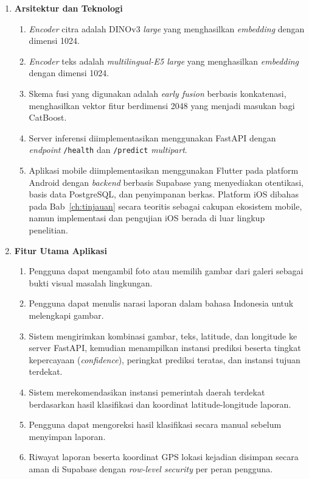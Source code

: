 \begin{enumerate}
    \item \textbf{Arsitektur dan Teknologi}
    \begin{enumerate}
        \item \textit{Encoder} citra adalah DINOv3 \textit{large} \citep{simeoniDINOv32025} yang menghasilkan \textit{embedding} dengan dimensi 1024.
        \item \textit{Encoder} teks adalah \textit{multilingual-E5 large} \citep{wangE5Multilingual2024} yang menghasilkan \textit{embedding} dengan dimensi 1024.
        \item Skema fusi yang digunakan adalah \textit{early fusion} berbasis konkatenasi, menghasilkan vektor fitur berdimensi 2048 yang menjadi masukan bagi CatBoost.
        \item Server inferensi diimplementasikan menggunakan FastAPI dengan \textit{endpoint} \texttt{/health} dan \texttt{/predict} \textit{multipart}.
        \item Aplikasi mobile diimplementasikan menggunakan Flutter pada platform Android dengan \textit{backend} berbasis Supabase yang menyediakan otentikasi, basis data PostgreSQL, dan penyimpanan berkas. Platform iOS dibahas pada Bab~\ref{ch:tinjauan} secara teoritis sebagai cakupan ekosistem mobile, namun implementasi dan pengujian iOS berada di luar lingkup penelitian.
    \end{enumerate}

    \item \textbf{Fitur Utama Aplikasi}
    \begin{enumerate}
        \item Pengguna dapat mengambil foto atau memilih gambar dari galeri sebagai bukti visual masalah lingkungan.
        \item Pengguna dapat menulis narasi laporan dalam bahasa Indonesia untuk melengkapi gambar.
        \item Sistem mengirimkan kombinasi gambar, teks, latitude, dan longitude ke server FastAPI, kemudian menampilkan instansi prediksi beserta tingkat kepercayaan (\textit{confidence}), peringkat prediksi teratas, dan instansi tujuan terdekat.
        \item Sistem merekomendasikan instansi pemerintah daerah terdekat berdasarkan hasil klasifikasi dan koordinat latitude-longitude laporan.
        \item Pengguna dapat mengoreksi hasil klasifikasi secara manual sebelum menyimpan laporan.
        \item Riwayat laporan beserta koordinat GPS lokasi kejadian disimpan secara aman di Supabase dengan \textit{row-level security} per peran pengguna.
    \end{enumerate}


\end{enumerate}
